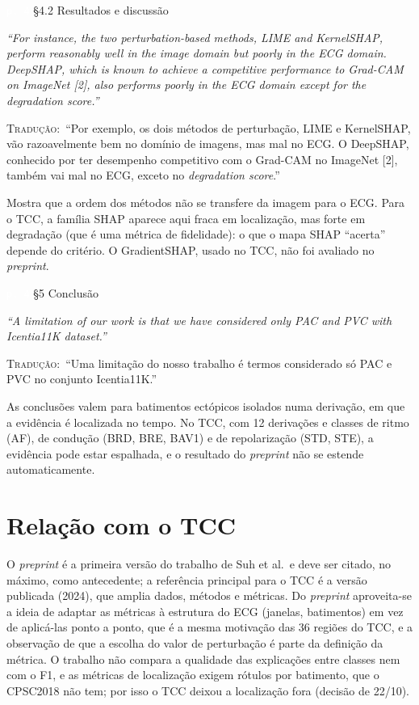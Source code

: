 \documentclass[11pt,a4paper]{article}
\newcommand{\pagechip}[1]{{\setlength{\fboxsep}{1.5pt}\colorbox{cAcc}{\textcolor{white}{\scriptsize\texttt{#1}}}}}
\newenvironment{origquote}{\par\itshape\small}{\par}
\newenvironment{tradquote}{\par\small\textsc{Tradução:}\ }{\par}
\newcommand{\explab}[1]{\par\smallskip{\small\color{cAcc}\textbf{\MakeUppercase{#1}}}\par}
\begin{document}
\begin{citacard}{\pagechip{p. 4} §4.2 Resultados e discussão}
\begin{origquote}“For instance, the two perturbation-based methods, LIME and KernelSHAP, perform reasonably well in the image domain but poorly in the ECG domain. DeepSHAP, which is known to achieve a competitive performance to Grad-CAM on ImageNet [2], also performs poorly in the ECG domain except for the degradation score.”\end{origquote}
\begin{tradquote}“Por exemplo, os dois métodos de perturbação, LIME e KernelSHAP, vão razoavelmente bem no domínio de imagens, mas mal no ECG. O DeepSHAP, conhecido por ter desempenho competitivo com o Grad-CAM no ImageNet [2], também vai mal no ECG, exceto no \textit{degradation score}.”\end{tradquote}
\explab{Explicação}
Mostra que a ordem dos métodos não se transfere da imagem para o ECG. Para o TCC, a família SHAP aparece aqui fraca em localização, mas forte em degradação (que é uma métrica de fidelidade): o que o mapa SHAP “acerta” depende do critério. O GradientSHAP, usado no TCC, não foi avaliado no \textit{preprint}.
\end{citacard}

\begin{citacard}{\pagechip{p. 4} §5 Conclusão}
\begin{origquote}“A limitation of our work is that we have considered only PAC and PVC with Icentia11K dataset.”\end{origquote}
\begin{tradquote}“Uma limitação do nosso trabalho é termos considerado só PAC e PVC no conjunto Icentia11K.”\end{tradquote}
\explab{Explicação}
As conclusões valem para batimentos ectópicos isolados numa derivação, em que a evidência é localizada no tempo. No TCC, com 12 derivações e classes de ritmo (AF), de condução (BRD, BRE, BAV1) e de repolarização (STD, STE), a evidência pode estar espalhada, e o resultado do \textit{preprint} não se estende automaticamente.
\end{citacard}

\section{Relação com o TCC}
O \textit{preprint} é a primeira versão do trabalho de Suh et al.\ e deve ser citado, no máximo, como antecedente; a referência principal para o TCC é a versão publicada (2024), que amplia dados, métodos e métricas. Do \textit{preprint} aproveita-se a ideia de adaptar as métricas à estrutura do ECG (janelas, batimentos) em vez de aplicá-las ponto a ponto, que é a mesma motivação das 36 regiões do TCC, e a observação de que a escolha do valor de perturbação é parte da definição da métrica. O trabalho não compara a qualidade das explicações entre classes nem com o F1, e as métricas de localização exigem rótulos por batimento, que o CPSC2018 não tem; por isso o TCC deixou a localização fora (decisão de 22/10).
\end{document}
